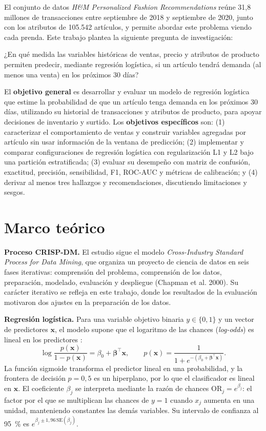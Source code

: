 \documentclass[
  journal=largetwo,
  manuscript=Laboratorio-Numero-02,
  year=2026,
  volume=1
]{cup-journal}
\begin{document}
El conjunto de datos \textit{H\&M Personalized Fashion Recommendations} \autocite{kaggle2022hm} reúne 31,8 millones de transacciones entre septiembre de 2018 y septiembre de 2020, junto con los atributos de 105.542 artículos, y permite abordar este problema viendo cada prenda. Este trabajo plantea la siguiente pregunta de investigación:

¿En qué medida las variables históricas de ventas, precio y atributos de producto permiten predecir, mediante regresión logística, si un artículo tendrá demanda (al menos una venta) en los próximos 30 días?

El \textbf{objetivo general} es desarrollar y evaluar un modelo de regresión logística que estime la probabilidad de que un artículo tenga demanda en los próximos 30 días, utilizando su historial de transacciones y atributos de producto, para apoyar decisiones de inventario y surtido. Los \textbf{objetivos específicos} son: (1) caracterizar el comportamiento de ventas y construir variables agregadas por artículo sin usar información de la ventana de predicción; (2) implementar y comparar configuraciones de regresión logística con regularización L1 y L2 bajo una partición estratificada; (3) evaluar su desempeño con matriz de confusión, exactitud, precisión, sensibilidad, F1, ROC-AUC y métricas de calibración; y (4) derivar al menos tres hallazgos y recomendaciones, discutiendo limitaciones y sesgos.

\section{Marco teórico}

\textbf{Proceso CRISP-DM.} El estudio sigue el modelo \textit{Cross-Industry Standard Process for Data Mining}, que organiza un proyecto de ciencia de datos en seis fases iterativas: comprensión del problema, comprensión de los datos, preparación, modelado, evaluación y despliegue (Chapman et al. 2000). Su carácter iterativo se refleja en este trabajo, donde los resultados de la evaluación motivaron dos ajustes en la preparación de los datos.

\textbf{Regresión logística.} Para una variable objetivo binaria $y\in\{0,1\}$ y un vector de predictores $\mathbf{x}$, el modelo supone que el logaritmo de las chances (\textit{log-odds}) es lineal en los predictores \autocite{hosmer2013applied}:
\begin{equation}
\log\frac{p(\mathbf{x})}{1-p(\mathbf{x})}=\beta_0+\boldsymbol{\beta}^\top\mathbf{x},
\qquad
p(\mathbf{x})=\frac{1}{1+e^{-(\beta_0+\boldsymbol{\beta}^\top\mathbf{x})}}.
\label{eq:logit}
\end{equation}
La función sigmoide transforma el predictor lineal en una probabilidad, y la frontera de decisión $p=0{,}5$ es un hiperplano, por lo que el clasificador es lineal en $\mathbf{x}$. El coeficiente $\beta_j$ se interpreta mediante la razón de chances $\mathrm{OR}_j=e^{\beta_j}$: el factor por el que se multiplican las chances de $y=1$ cuando $x_j$ aumenta en una unidad, manteniendo constantes las demás variables. Su intervalo de confianza al 95~\% es $e^{\beta_j\pm1{,}96\,\mathrm{SE}(\beta_j)}$.
\end{document}
